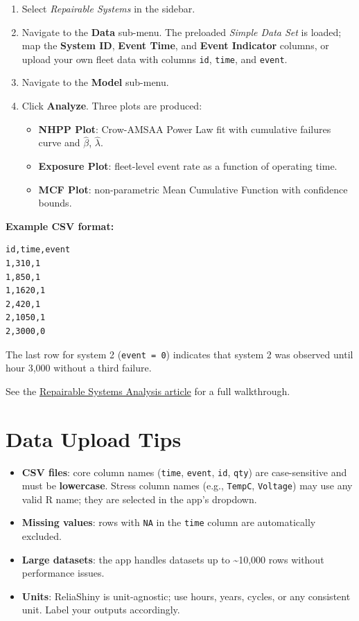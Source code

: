 \documentclass[
  letterpaper,
  DIV=11,
  numbers=noendperiod]{scrreprt}
\providecommand{\tightlist}{%
  \setlength{\itemsep}{0pt}\setlength{\parskip}{0pt}}
\begin{document}
\begin{enumerate}
\def\labelenumi{\arabic{enumi}.}
\tightlist
\item
  Select \emph{Repairable Systems} in the sidebar.
\item
  Navigate to the \textbf{Data} sub-menu. The preloaded \emph{Simple
  Data Set} is loaded; map the \textbf{System ID}, \textbf{Event Time},
  and \textbf{Event Indicator} columns, or upload your own fleet data
  with columns \texttt{id}, \texttt{time}, and \texttt{event}.
\item
  Navigate to the \textbf{Model} sub-menu.
\item
  Click \textbf{Analyze}. Three plots are produced:

  \begin{itemize}
  \tightlist
  \item
    \textbf{NHPP Plot}: Crow-AMSAA Power Law fit with cumulative
    failures curve and \(\hat{\beta}\), \(\hat{\lambda}\).
  \item
    \textbf{Exposure Plot}: fleet-level event rate as a function of
    operating time.
  \item
    \textbf{MCF Plot}: non-parametric Mean Cumulative Function with
    confidence bounds.
  \end{itemize}
\end{enumerate}

\textbf{Example CSV format:}

\begin{verbatim}
id,time,event
1,310,1
1,850,1
1,1620,1
2,420,1
2,1050,1
2,3000,0
\end{verbatim}

The last row for system 2 (\texttt{event\ =\ 0}) indicates that system 2
was observed until hour 3,000 without a third failure.

See the
\href{https://paulgovan.github.io/ReliaShiny/articles/RS.html}{Repairable
Systems Analysis article} for a full walkthrough.

\section{Data Upload Tips}\label{data-upload-tips}

\begin{itemize}
\tightlist
\item
  \textbf{CSV files}: core column names (\texttt{time}, \texttt{event},
  \texttt{id}, \texttt{qty}) are case-sensitive and must be
  \textbf{lowercase}. Stress column names (e.g., \texttt{TempC},
  \texttt{Voltage}) may use any valid R name; they are selected in the
  app's dropdown.
\item
  \textbf{Missing values}: rows with \texttt{NA} in the \texttt{time}
  column are automatically excluded.
\item
  \textbf{Large datasets}: the app handles datasets up to
  \textasciitilde10,000 rows without performance issues.
\item
  \textbf{Units}: ReliaShiny is unit-agnostic; use hours, years, cycles,
  or any consistent unit. Label your outputs accordingly.
\end{itemize}
\end{document}
